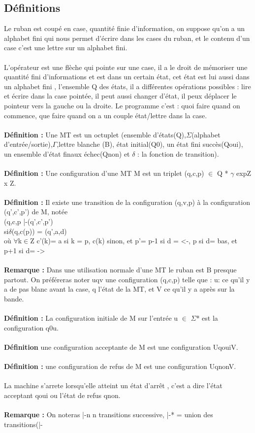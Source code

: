 \documentclass{article}
\begin{document}
\subsection{Définitions} 
Le ruban est coupé en case, quantité finie d'information, on suppose qu'on a un alphabet fini qui nous permet d'écrire dans les cases du ruban, et le contenu d'un case c'est une lettre sur un alphabet fini.\\\\L’opérateur est une flèche qui pointe sur une case, il a le droit de mémoriser une quantité fini d'informations et est dans un certain état, cet état est lui aussi dans un alphabet fini , l'ensemble Q des états, il a différentes opérations possibles : lire et écrire dans la case pointée, il peut aussi changer d'état, il peux déplacer le pointeur vers la gauche ou la droite. Le programme c'est  : quoi faire quand on commence, que faire quand on a un couple état/lettre dans la case.\\\\\textbf{Définition : }Une MT est un octuplet (ensemble d'états(Q),$\Sigma$(alphabet d'entrée/sortie),$\Gamma$,lettre blanche (B), état initial(Q0), un état fini succès(Qoui), un ensemble d'état finaux échec(Qnon) et $\delta$ : la fonction de transition).\\\\\textbf{Définition : } Une configuration d'une MT M est un triplet (q,c,p) $\in$ Q * $\gamma$ exp{Z} x Z.\\\\\textbf{Définition : } Il existe une transition de la configuration (q,v,p) à la configuration (q',c',p') de M, notée \\(q,c,p |-(q',c',p')\\si$\delta$(q,c(p)) = (q',a,d)\\où $\forall$k$\in$Z c'(k)= a si k = p, c(k) sinon, et p'=  p-1 si d = <-, p si d= bas, et p+1 si d= ->\\\\\textbf{Remarque : }Dans une utilisation normale d'une MT le ruban est B presque partout. On préféreras noter uqv une configuration (q,c,p) telle que : u: ce qu'il y a de pas blanc avant la case, q l'état de la MT, et V ce qu'il y a après sur la bande.\\\\\textbf{Définition : } La configuration initiale de M sur l'entrée u $\in$ $\Sigma$* est la configuration q0u.\\\\\textbf{Définition} une configuration acceptante de M est une configuration UqouiV.\\\\\textbf{Définition : }une configuration de refus de M est une configuration UqnonV.\\\\La machine s'arrete lorsqu'elle atteint un état d’arrêt , c’est a dire l'état acceptant qoui ou l'état de refus qnon.\\\\\textbf{Remarque : }On noteras |-n n transitions successive, |-* = union des transitions(|- 
\end{document}
